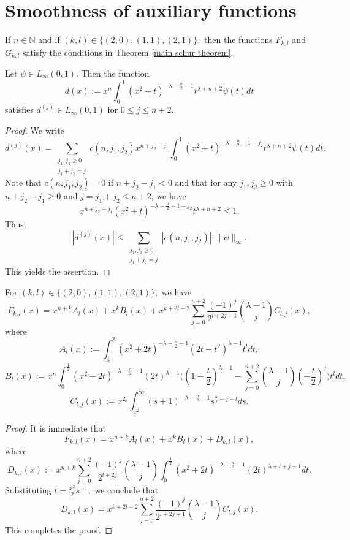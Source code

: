 \documentclass[12pt]{amsart}
\begin{document}
\appendix


\section{Smoothness of auxiliary functions}
\setcounter{equation}{0}

\begin{theorem}\label{fkl are smooth theorem} If $n\in\mathbb{N}$ and if $(k,l)\in\{(2,0),(1,1),(2,1)\},$ then the functions $F_{k,l}$ and $G_{k,l}$ satisfy the conditions in Theorem \ref{main schur theorem}.
\end{theorem}

\begin{lemma}\label{first fkl lemma} Let $\psi\in L_{\infty}(0,1).$ Then the function
$$d(x):=x^n\int_0^1(x^2+t)^{-\lambda-\frac{n}{2}-1}t^{\lambda+n+2}\psi(t)dt$$
satisfies $d^{(j)}\in L_{\infty}(0,1)$ for $0\leq j\leq n+2.$
\end{lemma}
\begin{proof} We write
$$d^{(j)}(x)=\sum_{\substack{j_1,j_2\geq0\\ j_1+j_2=j}}c(n,j_1,j_2)x^{n+j_2-j_1}\int_0^1(x^2+t)^{-\lambda-\frac{n}{2}-1-j_2}t^{\lambda+n+2}\psi(t)dt.$$
Note that $c(n,j_1,j_2)=0$ if $n+j_2-j_1<0$ and that for any $j_1,j_2\geq0$ with $n+j_2-j_1\geq 0$ and $j=j_1+j_2\leq n+2$, we have
$$x^{n+j_2-j_1}(x^2+t)^{-\lambda-\frac{n}{2}-1-j_2}t^{\lambda+n+2}\leq 1.$$
Thus,
$$|d^{(j)}(x)|\leq \sum_{\substack{j_1,j_2\geq0\\ j_1+j_2=j}}|c(n,j_1,j_2)|\cdot \|\psi\|_{\infty}.$$
This yields the assertion.
\end{proof}

\begin{lemma}\label{second fkl lemma} For $(k,l)\in\{(2,0),(1,1),(2,1)\},$ we have
$$F_{k,l}(x)=x^{n+k}A_l(x)+x^kB_l(x)+x^{k+2l-2}\sum_{j=0}^{n+2}\frac{(-1)^j}{2^{l+2j+1}}\binom{\lambda-1}{j}C_{l,j}(x),$$
where
$$A_l(x):=\int_{\frac12}^2(x^2+2t)^{-\lambda-\frac{n}{2}-1}(2t-t^2)^{\lambda-1}t^ldt,$$
$$B_l(x):=x^n\int_0^{\frac12}(x^2+2t)^{-\lambda-\frac{n}{2}-1}(2t)^{\lambda-1}\Big((1-\frac{t}{2})^{\lambda-1}-\sum_{j=0}^{n+2}\binom{\lambda-1}{j}(-\frac{t}{2})^j\Big)t^ldt,$$
$$C_{l,j}(x):=x^{2j}\int_{x^2}^{\infty}(s+1)^{-\lambda-\frac{n}{2}-1}s^{\frac{n}{2}-j-l}ds.$$
\end{lemma}
\begin{proof} It is immediate that
$$F_{k,l}(x)=x^{n+k}A_l(x)+x^kB_l(x)+D_{k,l}(x),$$
where
$$D_{k,l}(x):=x^{n+k}\sum_{j=0}^{n+2}\frac{(-1)^j}{2^{l+2j}}\binom{\lambda-1}{j}\int_0^{\frac12}(x^2+2t)^{-\lambda-\frac{n}{2}-1}(2t)^{\lambda+l+j-1}dt.$$
Substituting $t=\frac{x^2}{2}s^{-1},$ we conclude that
$$D_{k,l}(x)=x^{k+2l-2}\sum_{j=0}^{n+2}\frac{(-1)^j}{2^{l+2j+1}}\binom{\lambda-1}{j}C_{l,j}(x).$$
This completes the proof.
\end{proof}
\end{document}
